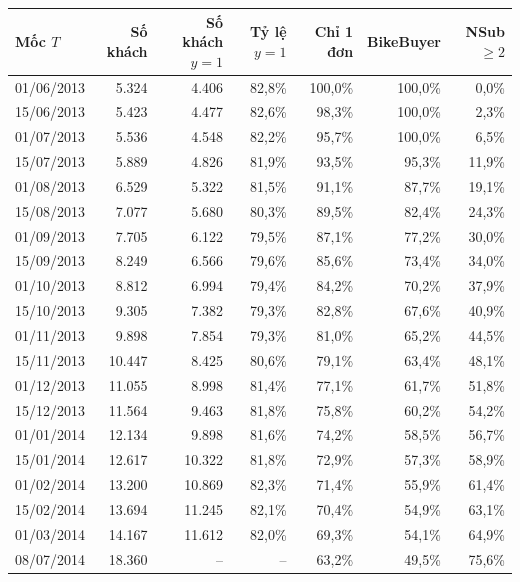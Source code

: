 \begin{tabular}{lrrrrrr}
\toprule
Mốc $T$ & Số khách & Số khách $y=1$ & Tỷ lệ $y=1$ & Chỉ 1 đơn & BikeBuyer & NSub $\geq 2$ \\
\midrule
01/06/2013 & 5.324 & 4.406 & 82,8\% & 100,0\% & 100,0\% & 0,0\% \\
15/06/2013 & 5.423 & 4.477 & 82,6\% & 98,3\% & 100,0\% & 2,3\% \\
01/07/2013 & 5.536 & 4.548 & 82,2\% & 95,7\% & 100,0\% & 6,5\% \\
15/07/2013 & 5.889 & 4.826 & 81,9\% & 93,5\% & 95,3\% & 11,9\% \\
01/08/2013 & 6.529 & 5.322 & 81,5\% & 91,1\% & 87,7\% & 19,1\% \\
15/08/2013 & 7.077 & 5.680 & 80,3\% & 89,5\% & 82,4\% & 24,3\% \\
01/09/2013 & 7.705 & 6.122 & 79,5\% & 87,1\% & 77,2\% & 30,0\% \\
15/09/2013 & 8.249 & 6.566 & 79,6\% & 85,6\% & 73,4\% & 34,0\% \\
01/10/2013 & 8.812 & 6.994 & 79,4\% & 84,2\% & 70,2\% & 37,9\% \\
15/10/2013 & 9.305 & 7.382 & 79,3\% & 82,8\% & 67,6\% & 40,9\% \\
01/11/2013 & 9.898 & 7.854 & 79,3\% & 81,0\% & 65,2\% & 44,5\% \\
15/11/2013 & 10.447 & 8.425 & 80,6\% & 79,1\% & 63,4\% & 48,1\% \\
01/12/2013 & 11.055 & 8.998 & 81,4\% & 77,1\% & 61,7\% & 51,8\% \\
15/12/2013 & 11.564 & 9.463 & 81,8\% & 75,8\% & 60,2\% & 54,2\% \\
01/01/2014 & 12.134 & 9.898 & 81,6\% & 74,2\% & 58,5\% & 56,7\% \\
15/01/2014 & 12.617 & 10.322 & 81,8\% & 72,9\% & 57,3\% & 58,9\% \\
01/02/2014 & 13.200 & 10.869 & 82,3\% & 71,4\% & 55,9\% & 61,4\% \\
15/02/2014 & 13.694 & 11.245 & 82,1\% & 70,4\% & 54,9\% & 63,1\% \\
01/03/2014 & 14.167 & 11.612 & 82,0\% & 69,3\% & 54,1\% & 64,9\% \\
08/07/2014 & 18.360 & -- & -- & 63,2\% & 49,5\% & 75,6\% \\
\bottomrule
\end{tabular}
